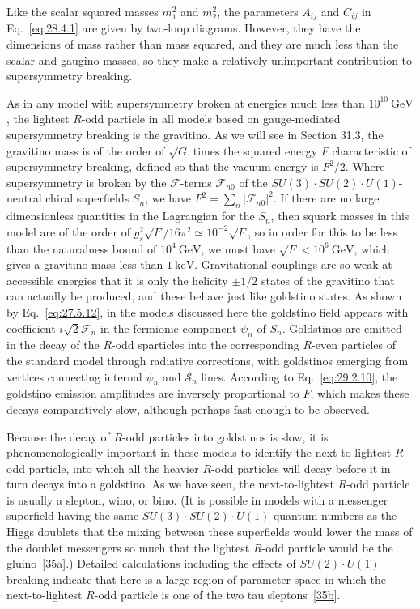 Like the scalar squared masses \(m_1^2\) and \(m_2^2\), the parameters
\(A_{ij}\) and \(C_{ij}\) in Eq.~\eqref{eq:28.4.1} are given by two-loop
diagrams. However, they have the dimensions of mass rather than mass
squared, and they are much less than the scalar and gaugino masses, so
they make a relatively unimportant contribution to supersymmetry breaking.

As in any model with supersymmetry broken at energies much less than
\(10^{10}\ \mathrm{GeV}\), the lightest \(R\)-odd particle in all models
based on gauge-mediated supersymmetry breaking is the gravitino. As we
will see in Section 31.3, the gravitino mass is of the order of
\(\sqrt{G}\) times the squared energy \(F\) characteristic of
supersymmetry breaking, defined so that the vacuum energy is \(F^2/2\).
Where supersymmetry is broken by the \(\mathcal{F}\)-terms
\(\mathcal{F}_{n0}\) of the
\(SU(3)\mathbin{\cdot}SU(2)\mathbin{\cdot}U(1)\)-neutral chiral
superfields \(S_n\), we have
\(F^2=\sum_n\lvert\mathcal{F}_{n0}\rvert^2\). If there are no large
dimensionless quantities in the Lagrangian for the \(S_n\), then squark
masses in this model are of the order of
\(g_s^2\sqrt{F}/16\pi^2\simeq10^{-2}\sqrt{F}\), so in order for this to
be less than the naturalness bound of \(10^4\ \mathrm{GeV}\), we must have
\(\sqrt{F}<10^6\ \mathrm{GeV}\), which gives a gravitino mass less than
\(1\ \mathrm{keV}\). Gravitational couplings are so weak at accessible
energies that it is only the helicity \(\pm1/2\) states of the gravitino
that can actually be produced, and these behave just like goldstino
states. As shown by Eq.~\eqref{eq:27.5.12}, in the models discussed here
the goldstino field appears with coefficient \(i\sqrt{2}\mathcal{F}_n\)
in the fermionic component \(\psi_n\) of \(S_n\). Goldstinos are emitted
in the decay of the \(R\)-odd sparticles into the corresponding \(R\)-even
particles of the standard model through radiative corrections, with
goldstinos emerging from vertices connecting internal \(\psi_n\) and
\(\mathcal{S}_n\) lines. According to Eq.~\eqref{eq:29.2.10}, the
goldstino emission amplitudes are inversely proportional to \(F\), which
makes these decays comparatively slow, although perhaps fast enough to be
observed.

Because the decay of \(R\)-odd particles into goldstinos is slow, it is
phenomenologically important in these models to identify the
next-to-lightest \(R\)-odd particle, into which all the heavier \(R\)-odd
particles will decay before it in turn decays into a goldstino. As we have
seen, the next-to-lightest \(R\)-odd particle is usually a slepton, wino,
or bino. (It is possible in models with a messenger superfield having the
same \(SU(3)\mathbin{\cdot}SU(2)\mathbin{\cdot}U(1)\) quantum numbers as
the Higgs doublets that the mixing between these superfields would lower
the mass of the doublet messengers so much that the lightest \(R\)-odd
particle would be the gluino~\hyperref[ch28-ref-35a]{[35a]}.) Detailed
calculations including the effects of \(SU(2)\mathbin{\cdot}U(1)\)
breaking indicate that here is a large region of parameter space in which
the next-to-lightest \(R\)-odd particle is one of the two tau
sleptons~\hyperref[ch28-ref-35b]{[35b]}.
